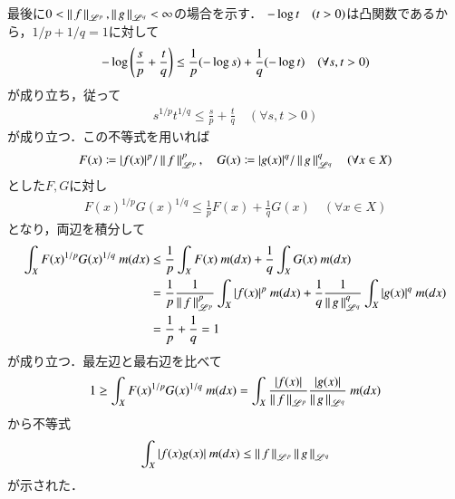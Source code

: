 \begin{qst}
\begin{prf}
\begin{description}
			最後に$0 < \left\|\, f\, \right\|_{\mathscr{L}^p},\left\|\, g\, \right\|_{\mathscr{L}^q} < \infty$の場合を示す．
			$-\operatorname{log} t \quad (t > 0)$は凸関数であるから，$1/p + 1/q = 1$に対して
			\begin{align}
				-\operatorname{log} \left( \frac{s}{p} + \frac{t}{q} \right) \leq \frac{1}{p}(-\operatorname{log} s) + \frac{1}{q}(-\operatorname{log} t) \quad (\forall s,t > 0)
			\end{align}
			が成り立ち，従って
			\begin{align}
				s^{1/p}t^{1/q} \leq \frac{s}{p} + \frac{t}{q} \quad (\forall s,t > 0)
			\end{align}
			が成り立つ．この不等式を用いれば
			\begin{align}
				F(x) \coloneqq |f(x)|^p/ \left\|\, f\, \right\|_{\mathscr{L}^p}^p,\quad G(x) \coloneqq |g(x)|^q/ \left\|\, g\, \right\|_{\mathscr{L}^q}^q \quad (\forall x \in X)
			\end{align}
			とした$F,G$に対し
			\begin{align}
				F(x)^{1/p}G(x)^{1/q} \leq \frac{1}{p}F(x) + \frac{1}{q}G(x) \quad (\forall x \in X)
			\end{align}
			となり，両辺を積分して
			\begin{align}
				\int_{X} F(x)^{1/p}G(x)^{1/q}\ m(dx) &\leq \frac{1}{p} \int_{X} F(x)\ m(dx) + \frac{1}{q} \int_{X} G(x)\ m(dx) \\
				&= \frac{1}{p} \frac{1}{\left\|\, f\, \right\|_{\mathscr{L}^p}^p} \int_{X} |f(x)|^p\ m(dx) + \frac{1}{q} \frac{1}{\left\|\, g\, \right\|_{\mathscr{L}^q}^q} \int_{X} |g(x)|^q\ m(dx) \\
				&= \frac{1}{p} + \frac{1}{q} = 1
			\end{align}
			が成り立つ．最左辺と最右辺を比べて
			\begin{align}
				1 \geq \int_{X} F(x)^{1/p}G(x)^{1/q}\ m(dx) = \int_{X} \frac{|f(x)|}{\left\|\, f\, \right\|_{\mathscr{L}^p}} \frac{|g(x)|}{\left\|\, g\, \right\|_{\mathscr{L}^q}}\ m(dx)
			\end{align}
			から不等式
			\begin{align}
				\int_{X} |f(x)g(x)|\ m(dx) \leq \left\|\, f\, \right\|_{\mathscr{L}^p}\left\|\, g\, \right\|_{\mathscr{L}^q}
			\end{align}
			が示された．
			\QED
	\end{description}
\end{prf}


\end{qst}
